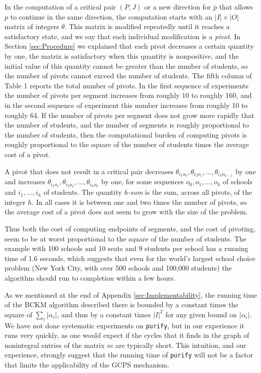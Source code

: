 \documentclass[12pt, A4paper]{article}
\theoremstyle{definition}
\newcommand{\barp}{\overline{p}}
\begin{document}
\begin{appendix}
In the computation  of  a critical pair $(P,J)$ or a new direction for $\barp$ that allows $p$ to continue in the same direction, the computation starts with an $|I| \times |O|$ matrix of integers $\theta$.  This matrix is modified repeatedly until it reaches a satisfactory state, and we say that each individual modification is a \emph{pivot}.  In Section \ref{sec:Procedure} we explained that each pivot decreases a certain quantity by one, the matrix is satisfactory when this quantity is nonpositive, and the initial value of this quantity cannot be greater than the number of students, so the number of pivots cannot exceed the number of students.  The fifth column of Table 1 reports the total number of pivots.  In the first sequence of experiments the number of pivots per segment increases from roughly 10 to roughly 160, and in the second sequence of experiment  this number increases from roughly 10 to roughly 64.  If the number of pivots per segment does not grow more rapidly that the number of students, and the number of segments is roughly proportional to the number of students, then the computational burden of computing pivots is roughly proportional to the square of the number of students times the average cost of a pivot. 

A pivot that does not result in a critical pair decreases $\theta_{i_1o_0},  \theta_{i_2o_1}, \ldots, \theta_{i_ho_{h-1}}$ by one and increases  $\theta_{i_1o_1}, \theta_{i_2o_2}, \ldots,  \theta_{i_ho_h}$ by one, for some sequences $o_0, o_1, \ldots, o_h$ of schools and $i_1, \ldots, i_h$ of students.  The quantity \emph{h-sum} is the sum, across all pivots, of the integer $h$.  In all cases it is between one and two times the number of pivots, so the average cost of a pivot does not seem to grow with the size of the problem.

Thus both the cost of computing endpoints of segments, and the cost of pivoting, seem to be at worst proportional to the square of the number of students.  The example with 100 schools and 10 seats and 9 students per school has a running time of 1.6 seconds, which suggests that even for the world's largest school choice problem (New York City, with over 500 schools and 100,000 students) the algorithm should run to completion within a few hours.

As we mentioned at the end of Appendix \ref{sec:Implementability}, the running time of the BCKM algorithm described there is bounded by a constant times the square of $\sum_i |\alpha_i|$, and thus by a constant times $|I|^2$ for any given bound on $|\alpha_i|$.  We have not done systematic experiments on  \texttt{purify}, but in our experience it runs very quickly, as one would expect if the cycles that it finds in the graph of nonintegral entries of the matrix $m$ are typically short.  This intuition, and our experience, strongly suggest that the running time of \texttt{purify} will not be a factor that limits the applicability of the GCPS mechanism.


\end{appendix}
\end{document}
